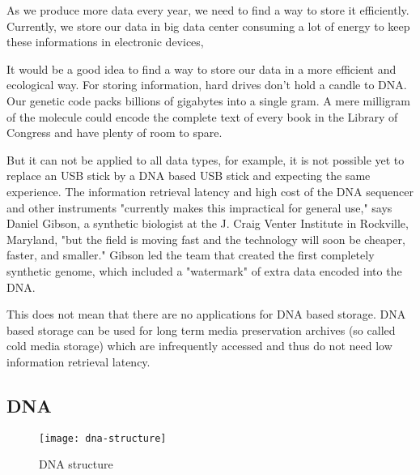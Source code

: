 
As we produce more data every year, we need to find a way to store it efficiently. Currently, we store our data in big data center consuming a lot of energy to keep these informations in electronic devices, 

It would be a good idea to find a way to store our data in a more efficient and ecological way. For storing information, hard drives don't hold a candle to DNA. Our genetic code packs billions of gigabytes into a single gram. A mere milligram of the molecule could encode the complete text of every book in the Library of Congress and have plenty of room to spare. \cite{bib:dna_data_storage}


But it can not be applied to all data types, for example, it is not possible yet to replace an USB stick by a DNA based USB stick and expecting the same experience. The information retrieval latency and high cost of the DNA sequencer and other instruments "currently makes this impractical for general use," says Daniel Gibson, a synthetic biologist at the J. Craig Venter Institute in Rockville, Maryland, "but the field is moving fast and the technology will soon be cheaper, faster, and smaller." Gibson led the team that created the first completely synthetic genome, which included a "watermark" of extra data encoded into the DNA. \cite{bib:dna_data_storage}

This does not mean that there are no applications for DNA based storage. DNA based storage can be used for long term media preservation archives (so called cold media storage) which are infrequently accessed and thus do not need low information retrieval latency.

\subsection{DNA}

\begin{figure}
    \centering
    \texttt{[image: dna-structure]}
    \caption{DNA structure}
    \label{fig:dna-structure}
\end{figure}

